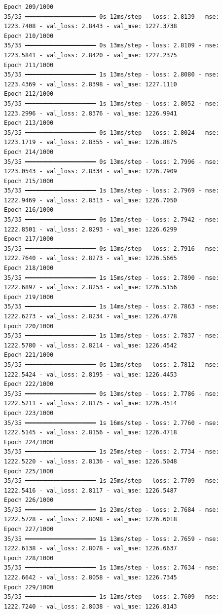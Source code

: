 \documentclass[
  letterpaper,
  DIV=11,
  numbers=noendperiod]{scrreprt}
\begin{document}
\begin{verbatim}
Epoch 209/1000
35/35 ━━━━━━━━━━━━━━━━━━━━ 0s 12ms/step - loss: 2.8139 - mse: 1223.7408 - val_loss: 2.8443 - val_mse: 1227.3738
Epoch 210/1000
35/35 ━━━━━━━━━━━━━━━━━━━━ 0s 13ms/step - loss: 2.8109 - mse: 1223.5841 - val_loss: 2.8420 - val_mse: 1227.2375
Epoch 211/1000
35/35 ━━━━━━━━━━━━━━━━━━━━ 1s 13ms/step - loss: 2.8080 - mse: 1223.4369 - val_loss: 2.8398 - val_mse: 1227.1110
Epoch 212/1000
35/35 ━━━━━━━━━━━━━━━━━━━━ 1s 13ms/step - loss: 2.8052 - mse: 1223.2996 - val_loss: 2.8376 - val_mse: 1226.9941
Epoch 213/1000
35/35 ━━━━━━━━━━━━━━━━━━━━ 0s 13ms/step - loss: 2.8024 - mse: 1223.1719 - val_loss: 2.8355 - val_mse: 1226.8875
Epoch 214/1000
35/35 ━━━━━━━━━━━━━━━━━━━━ 0s 13ms/step - loss: 2.7996 - mse: 1223.0543 - val_loss: 2.8334 - val_mse: 1226.7909
Epoch 215/1000
35/35 ━━━━━━━━━━━━━━━━━━━━ 1s 13ms/step - loss: 2.7969 - mse: 1222.9469 - val_loss: 2.8313 - val_mse: 1226.7050
Epoch 216/1000
35/35 ━━━━━━━━━━━━━━━━━━━━ 0s 13ms/step - loss: 2.7942 - mse: 1222.8501 - val_loss: 2.8293 - val_mse: 1226.6299
Epoch 217/1000
35/35 ━━━━━━━━━━━━━━━━━━━━ 0s 13ms/step - loss: 2.7916 - mse: 1222.7640 - val_loss: 2.8273 - val_mse: 1226.5665
Epoch 218/1000
35/35 ━━━━━━━━━━━━━━━━━━━━ 1s 15ms/step - loss: 2.7890 - mse: 1222.6897 - val_loss: 2.8253 - val_mse: 1226.5156
Epoch 219/1000
35/35 ━━━━━━━━━━━━━━━━━━━━ 1s 14ms/step - loss: 2.7863 - mse: 1222.6273 - val_loss: 2.8234 - val_mse: 1226.4778
Epoch 220/1000
35/35 ━━━━━━━━━━━━━━━━━━━━ 1s 13ms/step - loss: 2.7837 - mse: 1222.5780 - val_loss: 2.8214 - val_mse: 1226.4542
Epoch 221/1000
35/35 ━━━━━━━━━━━━━━━━━━━━ 0s 13ms/step - loss: 2.7812 - mse: 1222.5424 - val_loss: 2.8195 - val_mse: 1226.4453
Epoch 222/1000
35/35 ━━━━━━━━━━━━━━━━━━━━ 0s 13ms/step - loss: 2.7786 - mse: 1222.5211 - val_loss: 2.8175 - val_mse: 1226.4514
Epoch 223/1000
35/35 ━━━━━━━━━━━━━━━━━━━━ 1s 16ms/step - loss: 2.7760 - mse: 1222.5145 - val_loss: 2.8156 - val_mse: 1226.4718
Epoch 224/1000
35/35 ━━━━━━━━━━━━━━━━━━━━ 1s 25ms/step - loss: 2.7734 - mse: 1222.5220 - val_loss: 2.8136 - val_mse: 1226.5048
Epoch 225/1000
35/35 ━━━━━━━━━━━━━━━━━━━━ 1s 25ms/step - loss: 2.7709 - mse: 1222.5416 - val_loss: 2.8117 - val_mse: 1226.5487
Epoch 226/1000
35/35 ━━━━━━━━━━━━━━━━━━━━ 1s 23ms/step - loss: 2.7684 - mse: 1222.5728 - val_loss: 2.8098 - val_mse: 1226.6018
Epoch 227/1000
35/35 ━━━━━━━━━━━━━━━━━━━━ 1s 13ms/step - loss: 2.7659 - mse: 1222.6138 - val_loss: 2.8078 - val_mse: 1226.6637
Epoch 228/1000
35/35 ━━━━━━━━━━━━━━━━━━━━ 1s 13ms/step - loss: 2.7634 - mse: 1222.6642 - val_loss: 2.8058 - val_mse: 1226.7345
Epoch 229/1000
35/35 ━━━━━━━━━━━━━━━━━━━━ 1s 12ms/step - loss: 2.7609 - mse: 1222.7240 - val_loss: 2.8038 - val_mse: 1226.8143

\end{verbatim}
\end{document}
